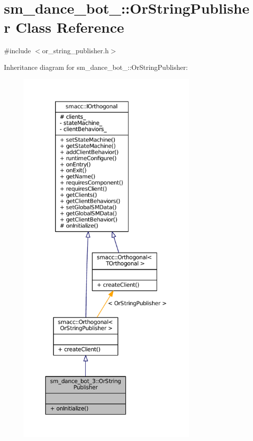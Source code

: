 \hypertarget{classsm__dance__bot__3_1_1OrStringPublisher}{}\section{sm\+\_\+dance\+\_\+bot\+\_\+:\+:Or\+String\+Publisher Class Reference}
\label{classsm__dance__bot__3_1_1OrStringPublisher}


{\ttfamily \#include $<$or\+\_\+string\+\_\+publisher.\+h$>$}



Inheritance diagram for sm\+\_\+dance\+\_\+bot\+\_\+:\+:Or\+String\+Publisher\+:
\nopagebreak
\begin{figure}[H]
\begin{center}
\leavevmode
\includegraphics[height=550pt]{classsm__dance__bot__3_1_1OrStringPublisher__inherit__graph}
\end{center}
\end{figure}


